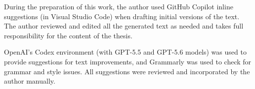 \label{ai-declaration}

During the preparation of this work, the author used GitHub Copilot inline suggestions (in Visual Studio Code) when drafting initial versions of the text. The author reviewed and edited all the generated text as needed and takes full responsibility for the content of the thesis.

OpenAI's Codex environment (with GPT-5.5 and GPT-5.6 models) was used to provide suggestions for text improvements, and Grammarly was used to check for grammar and style issues. All suggestions were reviewed and incorporated by the author manually.
